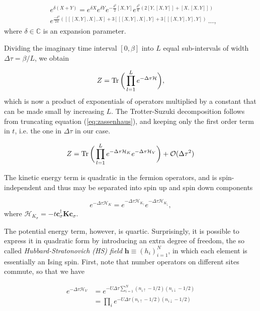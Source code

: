 \begin{equation}\label{eq:zassenhaus}
\begin{split}
&e^{\delta (X+Y)}=e^{\delta X} e^{\delta Y} e^{-{\frac {\delta^{2}}{2}}[X,Y]} e^{{\frac {\delta^{3}}{6}}(2[Y,[X,Y]]+[X,[X,Y]])} \\
&e^{{\frac {-\delta^{4}}{24}}([[[X,Y],X],X]+3[[[X,Y],X],Y]+3[[[X,Y],Y],Y])} \, ... , 
\end{split}
\end{equation}
where $\delta \in \mathbb{C}$ is an expansion parameter.

Dividing the imaginary time interval $[0, \beta ]$ into $L$ equal sub-intervals of width $\Delta \tau = \beta / L$, we obtain

\begin{equation}
Z = \operatorname{Tr} \bigg( \prod_{l=1}^L e^{-\Delta\tau \mathcal{H} } \bigg) ,
\end{equation}
which is now a product of exponentials of operators multiplied by a constant that can be made small by increasing $L$. The Trotter-Suzuki decomposition follows from truncating equation (\ref{eq:zassenhaus}), and keeping only the first order term in $t$, i.e. the one in $\Delta \tau$ in our case.

\begin{equation}\label{eq:Z_propagator}
Z = \operatorname{Tr} \bigg( \prod_{l=1}^L e^{-\Delta\tau \mathcal{H}_K } e^{-\Delta\tau \mathcal{H}_V } \bigg) + \mathcal{O}(\Delta \tau^2) 
\end{equation}

The kinetic energy term is quadratic in the fermion operators, and is spin-independent and thus may be separated into spin up and spin down components

\begin{equation}
e^{-\Delta\tau \mathcal{H}_K} = e^{-\Delta\tau \mathcal{H}_{K_\uparrow}} e^{-\Delta\tau \mathcal{H}_{K_\downarrow}} ,
\end{equation}
where $\mathcal{H}_{K_\sigma} = -t \bm c_\sigma^\dagger \bm K  \bm c_\sigma$.

The potential energy term, however, is quartic. Surprisingly, it is possible to express it in quadratic form by introducing an extra degree of freedom, the so called \emph{Hubbard-Stratonovich (HS) field} $\bm h \equiv (h_i)_{i=1}^N$, in which each element is essentially an Ising spin. First, note that number operators on different sites commute, so that we have

\begin{equation}
\begin{split}
e^{-\Delta\tau \mathcal{H}_V} &= e^{-U \Delta\tau \sum_{i=1}^N (n_{i\uparrow} - 1/2 ) (n_{i\downarrow} - 1/2 )} \\
&= \prod_i e^{-U \Delta\tau (n_{i\uparrow} - 1/2 ) (n_{i\downarrow} - 1/2 )}
\end{split}
\end{equation}

